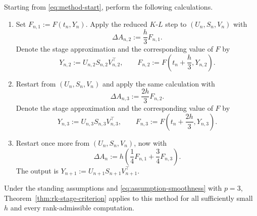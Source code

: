 \documentclass[]{article}
\numberwithin{equation}{section}
\theoremstyle{plain}
\theoremstyle{remark}
\numberwithin{algorithm}{section}
\begin{document}
Starting from \eqref{eq:method-start}, perform the following calculations.
\begin{enumerate}
\item Set \(F_{n,1}:=F(t_n,Y_n)\).  Apply the reduced \(K\)-\(L\) step to
\((U_n,S_n,V_n)\) with
\begin{equation}\label{eq:rk3-stage-two-increment}
 \Delta A_{n,2}:=\frac h3F_{n,1}.
\end{equation}
Denote the stage approximation and the corresponding value of \(F\) by
\begin{equation}\label{eq:rk3-stage-two}
 Y_{n,2}:=U_{n,2}S_{n,2}V_{n,2}^\top,
 \qquad F_{n,2}:=F\left(t_n+\frac h3,Y_{n,2}\right).
\end{equation}

\item Restart from \((U_n,S_n,V_n)\) and apply the same calculation
with
\begin{equation}\label{eq:rk3-stage-three-increment}
 \Delta A_{n,3}:=\frac{2h}{3}F_{n,2}.
\end{equation}
Denote the stage approximation and the corresponding value of \(F\) by
\begin{equation}\label{eq:rk3-stage-three}
 Y_{n,3}:=U_{n,3}S_{n,3}V_{n,3}^\top,
 \qquad F_{n,3}:=F\left(t_n+\frac{2h}{3},Y_{n,3}\right).
\end{equation}

\item Restart once more from \((U_n,S_n,V_n)\), now with
\begin{equation}\label{eq:rk3-final-increment}
 \Delta A_n:=h\left(\frac14F_{n,1}+\frac34F_{n,3}\right).
\end{equation}
The output is \(Y_{n+1}:=U_{n+1}S_{n+1}V_{n+1}^\top\).
\end{enumerate}

Under the standing assumptions and \eqref{eq:assumption-smoothness}
with \(p=3\), Theorem~\ref{thm:rk-stage-criterion} applies to this method
for all sufficiently small \(h\) and every rank-admissible computation.
\end{document}
